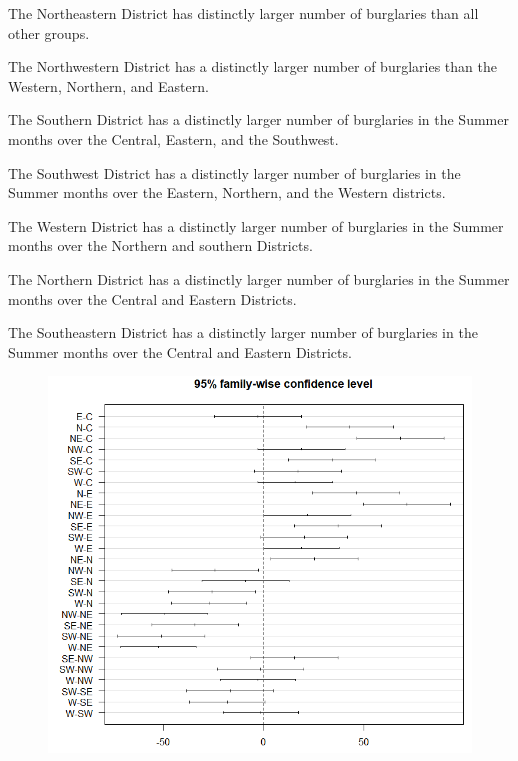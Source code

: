 \documentclass{article}
\begin{document}
\begin{enumerate}

{\setlength\itemindent{25pt}\item The Northeastern District has distinctly larger number of burglaries than all other groups.}
{\setlength\itemindent{25pt}\item The Northwestern District has a distinctly larger number of burglaries than the Western, Northern, and Eastern.}
{\setlength\itemindent{25pt}\item The Southern District has a distinctly larger number of burglaries in the Summer months over the Central, Eastern, and the Southwest.}
{\setlength\itemindent{25pt}\item The Southwest District has a distinctly larger number of burglaries in the Summer months over the Eastern, Northern, and the Western districts.  }
{\setlength\itemindent{25pt}\item The Western District has a distinctly larger number of burglaries in the Summer months over the Northern and southern Districts.}
{\setlength\itemindent{25pt}\item The Northern District has a distinctly larger number of burglaries in the Summer months over the Central and Eastern Districts. } 
{\setlength\itemindent{25pt}\item The Southeastern District has a distinctly larger number of burglaries in the Summer months over the Central and Eastern Districts.}
\end{enumerate} 
\begin{figure}[h]
\centering
\includegraphics[width = 1.0\textwidth]{TukeyHSD.png}
\end{figure}
\end{document}
